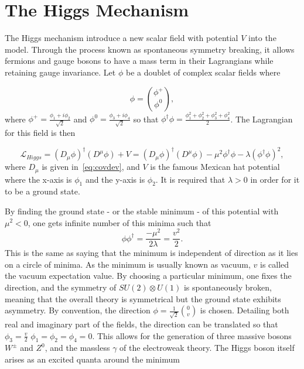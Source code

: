\section{The Higgs Mechanism}
\label{higgs}
The Higgs mechanism introduce a new scalar field with potential $V$ into the model. Through the process known as spontaneous symmetry breaking, it allows fermions and gauge bosons to have a mass term in their Lagrangians while retaining gauge invariance. Let $\phi$ be a doublet of complex scalar fields where

\begin{equation}
\phi = \binom{\phi^{+}}{\phi^{0}},
\end{equation}
where $\phi^{+} = \frac{\phi_{1} + i{\phi_{2}}}{\sqrt{2}}$ and $\phi^{0} = \frac{\phi_{3} + i{\phi_{4}}}{\sqrt{2}}$ so that $\phi^{\dagger}\phi = \frac{\phi_{1}^{2} + \phi_{2}^{2} + \phi_{3}^{2} + \phi_{4}^{2}}{2}$.  The Lagrangian for this field is then

\begin{equation}
	\mathcal{L}_{Higgs} = (D_{\mu}\phi)^{\dagger}(D^{\mu}\phi) + V = (D_{\mu}\phi)^{\dagger}(D^{\mu}\phi) - \mu^{2}\phi^{\dagger}\phi - \lambda (\phi^{\dagger}\phi)^{2},
\end{equation}
where $D_{\mu}$ is given in~\autoref{eq:covdev}, and $V$ is the famous Mexican hat potential where the x-axis is $\phi_{1}$ and the y-axis is $\phi_{2}$. It is required that $\lambda>0$ in order for it to be a ground state.

By finding the ground state - or the stable minimum - of this potential with $\mu^{2}<0$, one gets infinite number of this minima such that
\begin{equation}
	\phi\phi^{\dagger}=\frac{-\mu^{2}}{2\lambda}=\frac{v^{2}}{2}.
\end{equation}
This is the same as saying that the minimum is independent of direction as it lies on a circle of minima. As the minimum is usually known as vacuum, $v$ is called the vacuum expectation value. By choosing a particular minimum, one fixes the direction, and the symmetry of $SU(2)\otimes U(1)$ is spontaneously broken, meaning that the overall theory is symmetrical but the ground state exhibits asymmetry. By convention, the direction $\phi=\frac{1}{\sqrt{2}}\binom{0}{v}$ is chosen. Detailing both real and imaginary part of the fields, the direction can be translated so that $\phi_{3}=\frac{v}{2}$ $\phi_{1}=\phi_{2}=\phi_{4}=0$. This allows for the generation of three massive bosons $W^{\pm}$ and $Z^{0}$, and the massless $\gamma$ of the electroweak theory. The Higgs boson itself arises as an excited quanta around the minimum 

